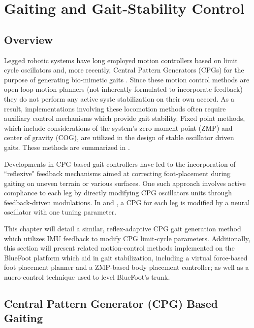 \chapter{Gaiting and Gait-Stability Control}
\label{ch::gait_control}



	\section{Overview}

		Legged robotic systems have long employed motion controllers based on limit cycle oscillators and, more recently, Central Pattern Generators (CPGs)  for the purpose of generating bio-mimetic gaits \cite{Matsuoka1985,Collins1993,Endo2004,Righetti2006,Ijspeert2008,Matos2010,Ajallooeian2013,Park2014,Fukuoka2015}. Since these motion control methods are open-loop motion planners (\IE not inherently formulated to incorporate feedback) they do not perform any active syste stabilization on their own accord. As a result, implementations involving these  locomotion methods often require auxiliary control mechanisms which provide gait stability. Fixed point methods, which include considerations of the system's zero-moment point (ZMP) and center of gravity (COG), are utilized in the design of stable oscillator driven gaits. These methods are summarized in \cite{Wieber2015}. %

		Developments in CPG-based gait controllers have led to the incorporation of ``reflexive" feedback mechanisms aimed at correcting foot-placement during gaiting on uneven terrain or various surfaces. One such approach involves active compliance to each leg by directly modifying CPG oscillators units through feedback-driven modulations. In \cite{Fukuoka2003} and \cite{Endo2004}, a CPG for each leg is modified by a neural oscillator with one tuning parameter. 

		This chapter will detail a similar, reflex-adaptive CPG gait generation method which utilizes IMU feedback to modify CPG limit-cycle parameters. Additionally, this section will present related motion-control methods implemented on the BlueFoot platform which aid in gait stabilization, including a virtual force-based foot placement planner and a ZMP-based body placement controller; as well as a nuero-control technique used to level BlueFoot's trunk.




	\section{Central Pattern Generator (CPG) Based Gaiting}

